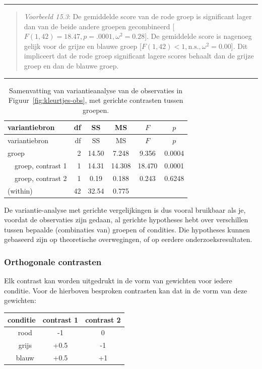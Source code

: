 \documentclass[
]{book}
\begin{document}
\begin{center}\rule{0.5\linewidth}{0.5pt}\end{center}

\begin{quote}
\emph{Voorbeeld 15.3}:
De gemiddelde score van de rode
groep is significant lager dan van de beide andere groepen gecombineerd
{[}\(F(1,42)=18.47, p=.0001, \omega^2=0.28\){]}. De gemiddelde score is
nagenoeg gelijk voor de grijze en blauwe groep
{[}\(F(1,42)<1, \textrm{n.s.}, \omega^2=0.00\){]}.
Dit impliceert dat de
rode groep significant lagere scores behaalt dan de grijze groep en dan
de blauwe groep.
\end{quote}

\begin{center}\rule{0.5\linewidth}{0.5pt}\end{center}

\begin{longtable}[]{@{}lrcccc@{}}
\caption{\label{tab:kleurtjes-anova-contrast} Samenvatting van variantieanalyse van de observaties in Figuur~\ref{fig:kleurtjes-obs}, met gerichte contrasten tussen groepen.}\tabularnewline
\toprule
variantiebron & df & SS & MS & \(F\) & \(p\)\tabularnewline
\midrule
\endfirsthead
\toprule
variantiebron & df & SS & MS & \(F\) & \(p\)\tabularnewline
\midrule
\endhead
groep & 2 & 14.50 & 7.248 & 9.356 & 0.0004\tabularnewline
~~groep, contrast 1 & 1 & 14.31 & 14.308 & 18.470 & 0.0001\tabularnewline
~~groep, contrast 2 & 1 & 0.19 & 0.188 & 0.243 & 0.6248\tabularnewline
(within) & 42 & 32.54 & 0.775 & &\tabularnewline
\bottomrule
\end{longtable}

De variantie-analyse met gerichte vergelijkingen is dus vooral bruikbaar
als je, voordat de observaties zijn gedaan, al gerichte hypotheses hebt
over verschillen tussen bepaalde (combinaties van) groepen of condities.
Die hypotheses kunnen gebaseerd zijn op theoretische overwegingen, of op
eerdere onderzoeksresultaten.

\hypertarget{orthogonale-contrasten}{%
\subsubsection{Orthogonale contrasten}\label{orthogonale-contrasten}}

Elk contrast kan worden uitgedrukt in de vorm van gewichten voor iedere
conditie. Voor de hierboven besproken contrasten kan dat in de vorm van
deze gewichten:

\begin{longtable}[]{@{}ccc@{}}
\toprule
conditie & contrast 1 & contrast 2\tabularnewline
\midrule
\endhead
~~rood & -1 & 0\tabularnewline
~~grijs & +0.5 & -1\tabularnewline
~~blauw & +0.5 & +1\tabularnewline
\bottomrule
\end{longtable}
\end{document}
